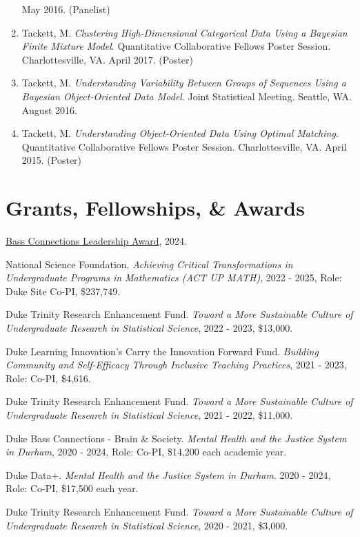 \documentclass[11pt,dvipsnames]{article}
\begin{document}
\begin{enumerate}
  May 2016. (Panelist)
\item
  Tackett, M. \emph{Clustering High-Dimensional Categorical Data Using a
  Bayesian Finite Mixture Model}. Quantitative Collaborative Fellows
  Poster Session. Charlottesville, VA. April 2017. (Poster)
\item
  Tackett, M. \emph{Understanding Variability Between Groups of
  Sequences Using a Bayesian Object-Oriented Data Model}. Joint
  Statistical Meeting. Seattle, WA. August 2016.
\item
  Tackett, M. \emph{Understanding Object-Oriented Data Using Optimal
  Matching}. Quantitative Collaborative Fellows Poster Session.
  Charlottesville, VA. April 2015. (Poster)
\end{enumerate}

\section{Grants, Fellowships, \&
Awards}\label{grants-fellowships-awards}

\href{https://bassconnections.duke.edu/about/news/deep-commitments-students-and-community-drive-winners-leadership-award}{Bass
Connections Leadership Award}, 2024.

National Science Foundation. \emph{Achieving Critical Transformations in
Undergraduate Programs in Mathematics (ACT UP MATH)}, 2022 - 2025, Role:
Duke Site Co-PI, \$237,749.

Duke Trinity Research Enhancement Fund. \emph{Toward a More Sustainable
Culture of Undergraduate Research in Statistical Science}, 2022 - 2023,
\$13,000.

Duke Learning Innovation's Carry the Innovation Forward Fund.
\emph{Building Community and Self-Efficacy Through Inclusive Teaching
Practices}, 2021 - 2023, Role: Co-PI, \$4,616.

Duke Trinity Research Enhancement Fund. \emph{Toward a More Sustainable
Culture of Undergraduate Research in Statistical Science}, 2021 - 2022,
\$11,000.

Duke Bass Connections - Brain \& Society. \emph{Mental Health and the
Justice System in Durham}, 2020 - 2024, Role: Co-PI, \$14,200 each
academic year.

Duke Data+. \emph{Mental Health and the Justice System in Durham}. 2020
- 2024, Role: Co-PI, \$17,500 each year.

Duke Trinity Research Enhancement Fund. \emph{Toward a More Sustainable
Culture of Undergraduate Research in Statistical Science}, 2020 - 2021,
\$3,000.
\end{document}
